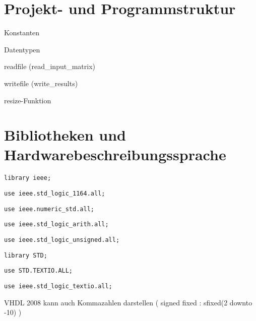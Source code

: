 \section{Projekt- und Programmstruktur}
 
 Konstanten
 
 Datentypen
 
 readfile (read\_input\_matrix) 
 
 writefile (write\_results)
 
 resize-Funktion

 
 
\section{Bibliotheken und Hardwarebeschreibungssprache}


\texttt{library ieee;}

\texttt{use ieee.std\_logic\_1164.all;}

\texttt{use ieee.numeric\_std.all;}

\texttt{use ieee.std\_logic\_arith.all;}

\texttt{use ieee.std\_logic\_unsigned.all;}


\texttt{library STD;}

\texttt{use STD.TEXTIO.ALL;}

\texttt{use ieee.std\_logic\_textio.all;}



VHDL 2008 kann auch Kommazahlen darstellen ( signed fixed : sfixed(2 downto -10) )